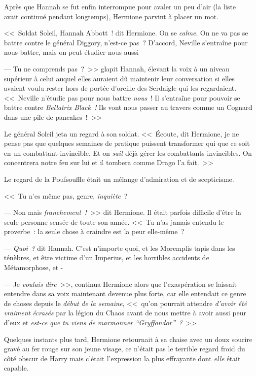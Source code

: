Après que Hannah se fut enfin interrompue pour avaler un peu d'air (la liste avait continué pendant longtemps), Hermione parvint à placer un mot.

<<~Soldat Soleil, Hannah Abbott~! dit Hermione. On se \emph{calme}. On ne va pas se battre contre le général Diggory, n'est-ce pas~? D'accord, Neville s'entraîne pour nous battre, mais on peut étudier nous aussi -

--- Tu ne comprends pas~?~>> glapit Hannah, élevant la voix à un niveau supérieur à celui auquel elles auraient dû maintenir leur conversation si elles avaient voulu rester hors de portée d'oreille des Serdaigle qui les regardaient. <<~Neville n'étudie pas pour nous battre \emph{nous}~! Il s'entraîne pour pouvoir se battre contre \emph{Bellatrix Black~!} Ils vont nous passer au travers comme un Cognard dans une pile de pancakes~!~>>

Le général Soleil jeta un regard à son soldat. <<~Écoute, dit Hermione, je ne pense pas que quelques semaines de pratique puissent transformer qui que ce soit en un combattant invincible. Et on \emph{sait} déjà gérer les combattants invincibles. On concentrera notre feu sur lui et il tombera comme Drago l'a fait.~>>

Le regard de la Poufsouffle était un mélange d'admiration et de scepticisme.

<<~Tu n'es même pas, genre, \emph{inquiète}~?

--- Non mais \emph{franchement~!}~>> dit Hermione. Il était parfois difficile d'être la seule personne sensée de toute son année. <<~Tu n'as jamais entendu le proverbe~: la seule chose à craindre est la peur elle-même~?

--- \emph{Quoi~?} dit Hannah. C'est n'importe quoi, et les Moremplis tapis dans les ténèbres, et être victime d'un Imperius, et les horribles accidents de Métamorphose, et -

--- Je \emph{voulais dire}~>>, continua Hermione alors que l'exaspération se laissait entendre dans sa voix maintenant devenue plus forte, car elle entendait ce genre de choses depuis le \emph{début de la semaine}, <<~qu'on pourrait attendre \emph{d'avoir été} \emph{vraiment} \emph{écrasés} par la légion du Chaos avant de nous mettre à avoir aussi peur d'eux et \emph{est-ce que tu viens de marmonner “Gryffondor”~?}~>>

Quelques instants plus tard, Hermione retournait à sa chaise avec un doux sourire gravé au fer rouge sur son jeune visage, ce n'était pas le terrible regard froid du côté obscur de Harry mais c'était l'expression la plus effrayante dont \emph{elle} était capable.

